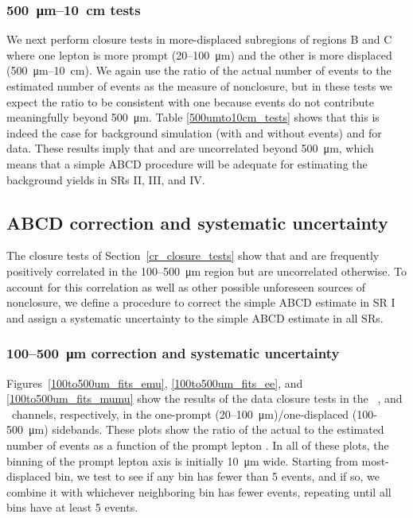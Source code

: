 

\subsubsection{\SI{500}{\um}--\SI{10}{\cm} tests}
We next perform closure tests in more-displaced subregions of regions B and C where one lepton is more prompt (\num{20}--\SI{100}{\um}) and the other is more displaced (\SI{500}{\um}--\SI{10}{\cm}). We again use the ratio of the actual number of events to the estimated number of events as the measure of nonclosure, but in these tests we expect the ratio to be consistent with one because \ztautaull events do not contribute meaningfully beyond \SI{500}{\um}. Table \ref{500umto10cm_tests} shows that this is indeed the case for background simulation (with and without \ztautaull events) and for data. These results imply that \ada and \adb are uncorrelated beyond \SI{500}{\um}, which means that a simple ABCD procedure will be adequate for estimating the background yields in SRs II, III, and IV.



\subsection{ABCD correction and systematic uncertainty}
\label{abcd_correction}
The closure tests of Section~\ref{cr_closure_tests} show that \ada and \adb are frequently positively correlated in the \num{100}--\SI{500}{\um} region but are uncorrelated otherwise. To account for this correlation as well as other possible unforeseen sources of nonclosure, we define a procedure to correct the simple ABCD estimate in SR I and assign a systematic uncertainty to the simple ABCD estimate in all SRs.

\subsubsection{\num{100}--\SI{500}{\um} correction and systematic uncertainty}
Figures~\ref{100to500um_fits_emu}, \ref{100to500um_fits_ee}, and \ref{100to500um_fits_mumu} show the results of the data closure tests in the \Pe\Pgm\, \Pe\Pe, and \Pgm\Pgm\ channels, respectively, in the one-prompt (\num{20}--\SI{100}{\um})/one-displaced (\num{100}-\SI{500}{\um}) sidebands. These plots show the ratio of the actual to the estimated number of events as a function of the prompt lepton \ad. In all of these plots, the binning of the prompt lepton axis is initially \SI{10}{\um} wide. Starting from most-displaced bin, we test to see if any bin has fewer than 5 events, and if so, we combine it with whichever neighboring bin has fewer events, repeating until all bins have at least 5 events.


